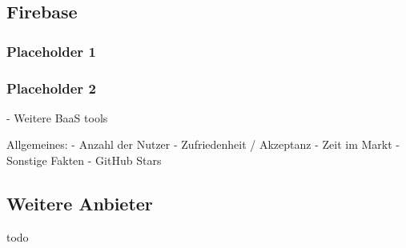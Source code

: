 \subsection{Firebase}

\subsubsection{Placeholder 1}
\subsubsection{Placeholder 2}

\autocite{moroney2017definitive}
\autocite{firebaseDocs}
\autocite{tanna2018serverless}

- Weitere BaaS tools

Allgemeines:
  - Anzahl der Nutzer
  - Zufriedenheit / Akzeptanz
  - Zeit im Markt
  - Sonstige Fakten
  - GitHub Stars

\subsection{Weitere Anbieter}

todo